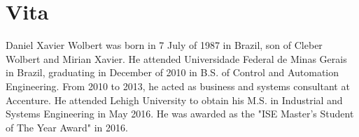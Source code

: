 \chapter*{Vita}

Daniel Xavier Wolbert was born in 7 July of 1987 in Brazil, son of Cleber Wolbert and Mirian Xavier. He attended Universidade Federal de Minas Gerais in Brazil, graduating in December of 2010 in B.S. of Control and Automation Engineering. From 2010 to 2013, he acted as business and systems consultant at Accenture. He attended Lehigh University to obtain his M.S. in Industrial and Systems Engineering in May 2016. He was awarded as the "ISE Master's Student of The Year Award" in 2016.